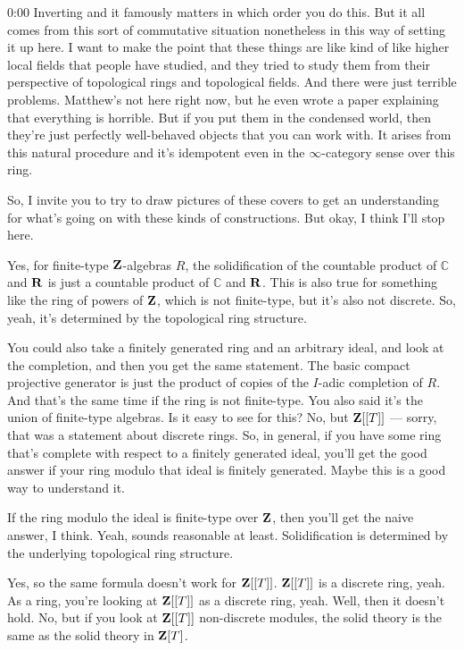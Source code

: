 \begin{unfinished}{0:00}
Inverting and it famously matters in which order you do this. But it all comes from this sort of commutative situation nonetheless in this way of setting it up here. I want to make the point that these things are like kind of like higher local fields that people have studied, and they tried to study them from their perspective of topological rings and topological fields. And there were just terrible problems. Matthew's not here right now, but he even wrote a paper explaining that everything is horrible. But if you put them in the condensed world, then they're just perfectly well-behaved objects that you can work with. It arises from this natural procedure and it's idempotent even in the $\infty$-category sense over this ring.

So, I invite you to try to draw pictures of these covers to get an understanding for what's going on with these kinds of constructions. But okay, I think I'll stop here.

Yes, for finite-type $\mathbf Z$-algebras $R$, the solidification of the countable product of $\mathbb{C}$ and $\mathbf R$ is just a countable product of $\mathbb{C}$ and $\mathbf R$. This is also true for something like the ring of powers of $\mathbf Z$, which is not finite-type, but it's also not discrete. So, yeah, it's determined by the topological ring structure.

You could also take a finitely generated ring and an arbitrary ideal, and look at the completion, and then you get the same statement. The basic compact projective generator is just the product of copies of the $I$-adic completion of $R$. And that's the same time if the ring is not finite-type. You also said it's the union of finite-type algebras. Is it easy to see for this? No, but $\mathbf Z[[T]]$ — sorry, that was a statement about discrete rings. So, in general, if you have some ring that's complete with respect to a finitely generated ideal, you'll get the good answer if your ring modulo that ideal is finitely generated. Maybe this is a good way to understand it.

If the ring modulo the ideal is finite-type over $\mathbf Z$, then you'll get the naive answer, I think. Yeah, sounds reasonable at least. Solidification is determined by the underlying topological ring structure.

Yes, so the same formula doesn't work for $\mathbf Z[[T]]$. $\mathbf Z[[T]]$ is a discrete ring, yeah. As a ring, you're looking at $\mathbf Z[[T]]$ as a discrete ring, yeah. Well, then it doesn't hold. No, but if you look at $\mathbf Z[[T]]$ non-discrete modules, the solid theory is the same as the solid theory in $\mathbf Z[T]$.


\end{unfinished}
